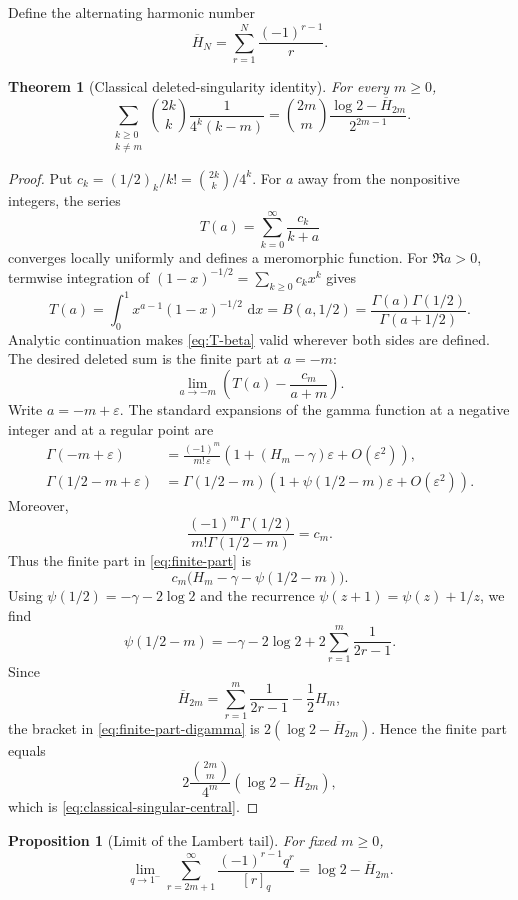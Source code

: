 \documentclass[11pt,oneside,openany]{book}
\newtheorem{theorem}{Theorem}[chapter]
\newtheorem{proposition}[proposition]{Proposition}
\theoremstyle{definition}
\theoremstyle{remark}
\newcommand{\eps}{\varepsilon}
\newcommand{\dd}{\,\mathrm d}
\begin{document}
Define the alternating harmonic number
\[
 \overline H_N=\sum_{r=1}^{N}\frac{(-1)^{r-1}}r.
\]

\begin{theorem}[Classical deleted-singularity identity]\label{thm:classical-singular-central}
For every $m\ge0$,
\[
 \sum_{\substack{k\ge0\\k\ne m}}
 \binom{2k}{k}\frac1{4^k(k-m)}
 =\binom{2m}{m}
 \frac{\log2-\overline H_{2m}}{2^{2m-1}}.
 \tag{18.16}\label{eq:classical-singular-central}
\]
\end{theorem}

\begin{proof}
Put $c_k=(1/2)_k/k!=\binom{2k}{k}/4^k$.  For $a$ away from the nonpositive integers, the series
\[
 T(a)=\sum_{k=0}^{\infty}\frac{c_k}{k+a}
\]
converges locally uniformly and defines a meromorphic function.  For $\Re a>0$, termwise integration of
$(1-x)^{-1/2}=\sum_{k\ge0}c_kx^k$ gives
\[
 T(a)=\int_0^1x^{a-1}(1-x)^{-1/2}\,\dd x
 =B(a,1/2)
 =\frac{\Gamma(a)\Gamma(1/2)}{\Gamma(a+1/2)}.
 \tag{18.17}\label{eq:T-beta}
\]
Analytic continuation makes \eqref{eq:T-beta} valid wherever both sides are defined.  The desired deleted sum is the finite part at $a=-m$:
\[
 \lim_{a\to-m}\left(T(a)-\frac{c_m}{a+m}\right).
 \tag{18.18}\label{eq:finite-part}
\]
Write $a=-m+\eps$.  The standard expansions of the gamma function at a negative integer and at a regular point are
\begin{align*}
 \Gamma(-m+\eps)
 &=\frac{(-1)^m}{m!\,\eps}
   \left(1+(H_m-\gamma)\eps+O(\eps^2)\right),\\
 \Gamma(1/2-m+\eps)
 &=\Gamma(1/2-m)
   \left(1+\psi(1/2-m)\eps+O(\eps^2)\right).
\end{align*}
Moreover,
\[
 \frac{(-1)^m\Gamma(1/2)}{m!\Gamma(1/2-m)}=c_m.
\]
Thus the finite part in \eqref{eq:finite-part} is
\[
 c_m\bigl(H_m-\gamma-\psi(1/2-m)\bigr).
 \tag{18.19}\label{eq:finite-part-digamma}
\]
Using $\psi(1/2)=-\gamma-2\log2$ and the recurrence
$\psi(z+1)=\psi(z)+1/z$, we find
\[
 \psi(1/2-m)
 =-\gamma-2\log2+2\sum_{r=1}^{m}\frac1{2r-1}.
\]
Since
\[
 \overline H_{2m}
 =\sum_{r=1}^{m}\frac1{2r-1}-\frac12H_m,
\]
the bracket in \eqref{eq:finite-part-digamma} is
$2(\log2-\overline H_{2m})$.  Hence the finite part equals
\[
 2\frac{\binom{2m}{m}}{4^m}
 (\log2-\overline H_{2m}),
\]
which is \eqref{eq:classical-singular-central}.
\end{proof}

\begin{proposition}[Limit of the Lambert tail]\label{prop:lambert-tail-limit}
For fixed $m\ge0$,
\[
 \lim_{q\to1^-}
 \sum_{r=2m+1}^{\infty}\frac{(-1)^{r-1}q^r}{[r]_q}
 =\log2-\overline H_{2m}.
 \tag{18.20}\label{eq:lambert-tail-limit}
\]
\end{proposition}
\end{document}
